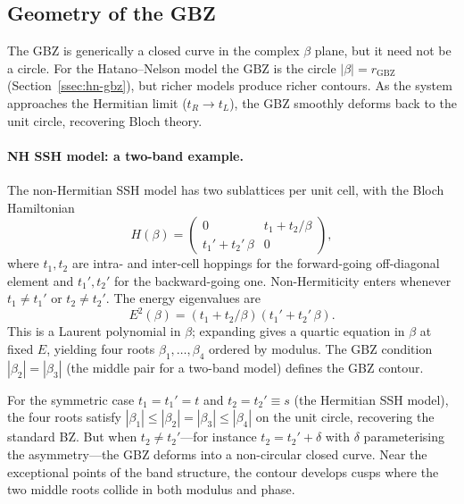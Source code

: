\subsection{Geometry of the GBZ}
\label{ssec:gbz-geometry}

The GBZ is generically a closed curve in the complex $\beta$ plane,
but it need not be a circle. For the Hatano--Nelson model the GBZ is
the circle $|\beta| = r_{\mathrm{GBZ}}$
(Section~\ref{ssec:hn-gbz}), but richer models produce richer
contours. As the system approaches the Hermitian limit
($t_R \to t_L$), the GBZ smoothly deforms back to the unit circle,
recovering Bloch theory.

\paragraph{NH SSH model: a two-band example.}
The non-Hermitian SSH model has two sublattices per unit cell, with
the Bloch Hamiltonian
\begin{equation}
 H(\beta) = \begin{pmatrix}
 0 & t_1 + t_2/\beta \\
 t_1' + t_2'\,\beta & 0
 \end{pmatrix},
 \label{eq:nhssh-bloch}
\end{equation}
where $t_1, t_2$ are intra- and inter-cell hoppings for the
forward-going off-diagonal element and $t_1', t_2'$ for the
backward-going one. Non-Hermiticity enters whenever $t_1 \neq t_1'$
or $t_2 \neq t_2'$. The energy eigenvalues are
\begin{equation}
 E^2(\beta) = (t_1 + t_2/\beta)(t_1' + t_2'\,\beta).
 \label{eq:nhssh-energy}
\end{equation}
This is a Laurent polynomial in $\beta$; expanding gives a quartic
equation in $\beta$ at fixed $E$, yielding four roots
$\beta_1, \ldots, \beta_4$ ordered by modulus. The GBZ condition
$|\beta_2| = |\beta_3|$ (the middle pair for a two-band model) defines
the GBZ contour.

For the symmetric case $t_1 = t_1' = t$ and
$t_2 = t_2' \equiv s$ (the Hermitian SSH model), the four roots
satisfy $|\beta_1| \le |\beta_2| = |\beta_3| \le |\beta_4|$ on the
unit circle, recovering the standard BZ. But when
$t_2 \neq t_2'$---for instance $t_2 = t_2' + \delta$ with $\delta$
parameterising the asymmetry---the GBZ deforms into a non-circular
closed curve. Near the exceptional points of the band structure,
the contour develops cusps where the two middle roots collide in
both modulus and phase.

